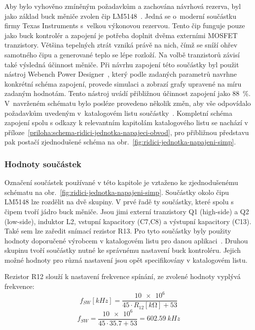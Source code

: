         
        Aby bylo vyhověno zmíněným požadavkům a zachována návrhová rezerva, byl jako základ buck měniče zvolen čip LM5148~\cite{lm5148-datasheet}. Jedná se o~moderní součástku firmy Texas Instruments s~velkou výkonovou rezervou. Tento čip funguje pouze jako buck kontrolér a zapojení je potřeba doplnit dvěma externími MOSFET tranzistory. Většina tepelných ztrát vzniká právě na nich, čímž se sníží ohřev samotného čipu a generované teplo se lépe rozloží. Na volbě tranzistorů závisí také výsledná účinnost měniče. Při návrhu zapojení této součástky byl použit nástroj Webench Power Designer~\cite{webench-power-designer}, který podle zadaných parametrů navrhne konkrétní schéma zapojení, provede simulaci a zobrazí grafy upravené na míru zadaným hodnotám. Tento nástroj uvádí přibližnou účinnost zapojení jako \qty{88}{\percent}. V~navrženém schématu bylo posléze provedeno několik změn, aby vše odpovídalo požadavkům uvedeným v~katalogovém listu součástky~\cite{lm5148-datasheet}. Kompletní schéma zapojení spolu s odkazy k relevantním kapitolám katalogového listu se nachází v příloze~\ref{priloha:schema-ridici-jednotka-napajeci-obvod}, pro přibližnou představu pak postačí zjednodušené schéma na obr.~\ref{fig:ridici-jednotka-napajeni-simp}. 

        \subsubsection{Hodnoty součástek}
        Označení součástek používané v této kapitole je vztaženo ke zjednodušenému schématu na obr.~\ref{fig:ridici-jednotka-napajeni-simp}. Součástky okolo čipu LM5148 lze rozdělit na dvě skupiny. V prvé řadě ty součástky, které spolu s čipem tvoří jádro buck měniče. Jsou jimi externí tranzistory Q1 (high-side) a Q2 (low-side), induktor L2, vstupní kapacitory (C7,C8) a výstupní kapacitory (C13). Také sem lze zaředit snímací rezistor R13. Pro tyto součástky byly použity hodnoty doporučené výrobcem v katalogovém listu pro danou aplikaci~\cite{lm5148-datasheet}. Druhou skupinu tvoří součástky nutné ke správnému nastavení buck kontroléru. Jejich možné hodnoty pro různá nastavení jsou opět specifikovány v katalogovém listu. 

        Rezistor R12 slouží k nastavení frekvence spínání, ze zvolené hodnoty vyplývá frekvence:
        \begin{equation}
            f_{SW}[\unit{kHz}] = \frac{\num{10e6}}{45\cdot R_{12}[\unit{k\ohm}]+53 }
        \end{equation}
        \begin{equation}
            f_{SW} = \frac{\num{10e6}}{45\cdot \num{35.7}+53 } = \qty{602.59}{kHz}
        \end{equation}

